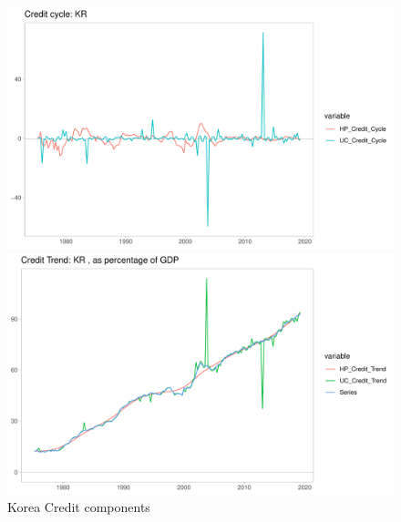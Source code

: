 \documentclass[fleqn]{article}
\begin{document}
\begin{outline}[enumerate]
\begin{figure}[h!]
	\caption{Korea Credit components}	
	\centerline{\includegraphics[scale=0.7]{../Output/Graphs/Credit_cycle_KR.pdf}}
	\centerline{\includegraphics[scale=0.7]{../Output/Graphs/Credit_trend_KR.pdf}}
\end{figure}


\end{outline}
\end{document}
